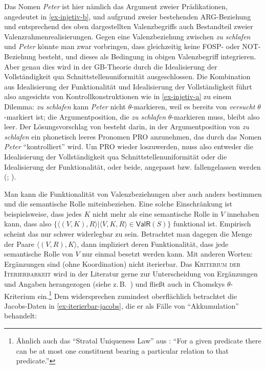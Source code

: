 Das Nomen {\it Peter} ist hier nämlich das Argument zweier Prädikationen, angedeutet in \ref{ex-injetiv-b}, und aufgrund zweier bestehenden ARG-Beziehung und entsprechend des oben dargestellten Valenzbegriffs auch Bestandteil zweier Valenzrahmenrealisierungen. Gegen eine Valenzbeziehung zwischen {\it zu schlafen} und {\it Peter} könnte man zwar vorbringen, dass gleichzeitig keine FOSP- oder NOT-Beziehung besteht, und dieses als Bedingung in obigen Valenzbegriff integrieren. Aber genau dies wird in der GB-Theorie durch die Idealisierung der Vollständigkeit qua Schnittstellenuniformität ausgeschlossen. Die Kombination aus Idealisierung der Funktionalität und Idealisierung der Vollständigkeit führt also angesichts von Kontrollkonstruktionen wie in \ref{ex-injetiv-a} zu einem Dilemma: {\it zu schlafen} kann {\it Peter} nicht $\theta$-markieren, weil es bereits von {\it versucht} $\theta$-markiert ist; die Argumentposition, die {\it zu schlafen} $\theta$-markieren muss, bleibt also leer. Der Lösungsvorschlag von \cite{Chomsky:81} besteht darin, in der Argumentposition von {\it zu schlafen} ein phonetisch leeres Pronomen PRO anzunehmen, das durch das Nomen {\it Peter} "`kontrolliert"' wird. Um PRO wieder loszuwerden, muss also entweder die Idealisierung der Vollständigkeit qua Schnittstellenuniformität oder die Idealisierung der Funktionalität, oder beide, angepasst bzw. fallengelassen werden (\citealt{Culicover:Wilkins:86}; \citealt[46, \S3.1.1]{Culicover:Jackendoff:06}). 

Man kann die Funktionalität von Valenzbeziehungen aber auch anders bestimmen und die semantische Rolle miteinbeziehen. Eine solche Einschränkung ist beispielsweise, dass jedes $K$ nicht mehr als eine semantische Rolle in $V$ innehaben kann, dass also $\{\langle (V,K), R \rangle | \langle V,K,R \rangle \in \mathsf{ValR}(S) \}$ funktional ist. Empirisch scheint das nur schwer widerlegbar zu sein. Betrachtet man dagegen die Menge der Paare $\langle (V,R),K \rangle$, dann impliziert deren Funktionalität, dass jede semantische Rolle von $V$ nur einmal besetzt werden kann. Mit anderen Worten: Ergänzungen sind (ohne Koordination) nicht iterierbar. Das \textsc{Kriterium der Iterierbarkeit} wird in der Literatur gerne zur Unterscheidung von Ergänzungen und Angaben herangezogen (siehe z.\,B.\ \citealt[22f]{Mueller:10}) und flie\ss t auch in Chomskys $\theta$-Kriterium ein.\footnote{Ähnlich auch das  "`Stratal Uniqueness Law"' aus \citet[255]{Kracht:02}: "`For a given predicate there can be at most one constituent bearing a particular relation to that predicate."'} Dem widersprechen zumindest oberflächlich betrachtet die Jacobs-Daten in \ref{ex-iterierbar-jacobs}, die er als Fälle von "`Akkumulation"' behandelt:

